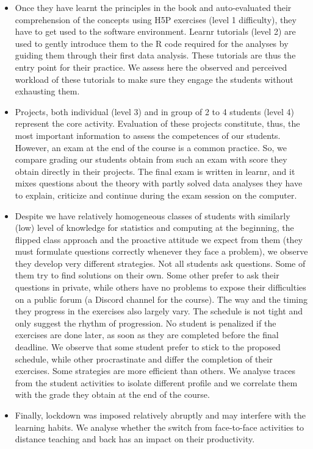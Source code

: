 \documentclass[
]{article}
\begin{document}
\begin{itemize}
\item
  Once they have learnt the principles in the book and auto-evaluated
  their comprehension of the concepts using H5P exercises (level 1
  difficulty), they have to get used to the software environment. Learnr
  tutorials (level 2) are used to gently introduce them to the R code
  required for the analyses by guiding them through their first data
  analysis. These tutorials are thus the entry point for their practice.
  We assess here the observed and perceived workload of these tutorials
  to make sure they engage the students without exhausting them.
\item
  Projects, both individual (level 3) and in group of 2 to 4 students
  (level 4) represent the core activity. Evaluation of these projects
  constitute, thus, the most important information to assess the
  competences of our students. However, an exam at the end of the course
  is a common practice. So, we compare grading our students obtain from
  such an exam with score they obtain directly in their projects. The
  final exam is written in learnr, and it mixes questions about the
  theory with partly solved data analyses they have to explain,
  criticize and continue during the exam session on the computer.
\item
  Despite we have relatively homogeneous classes of students with
  similarly (low) level of knowledge for statistics and computing at the
  beginning, the flipped class approach and the proactive attitude we
  expect from them (they must formulate questions correctly whenever
  they face a problem), we observe they develop very different
  strategies. Not all students ask questions. Some of them try to find
  solutions on their own. Some other prefer to ask their questions in
  private, while others have no problems to expose their difficulties on
  a public forum (a Discord channel for the course). The way and the
  timing they progress in the exercises also largely vary. The schedule
  is not tight and only suggest the rhythm of progression. No student is
  penalized if the exercises are done later, as soon as they are
  completed before the final deadline. We observe that some student
  prefer to stick to the proposed schedule, while other procrastinate
  and differ the completion of their exercises. Some strategies are more
  efficient than others. We analyse traces from the student activities
  to isolate different profile and we correlate them with the grade they
  obtain at the end of the course.
\item
  Finally, lockdown was imposed relatively abruptly and may interfere
  with the learning habits. We analyse whether the switch from
  face-to-face activities to distance teaching and back has an impact on
  their productivity.
\end{itemize}
\end{document}
